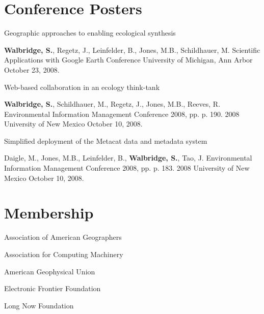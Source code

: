 \documentclass[letterpaper]{article}
\renewenvironment{itemize}{
  \begin{list}{}{
    \setlength{\leftmargin}{1.5em}
  }
}{
  \end{list}
}
\begin{document}
\section*{Conference Posters}
\begin{itemize}
\item Geographic approaches to enabling ecological synthesis
  \begin{itemize}
  \item {\bf Walbridge, S.}, Regetz, J., Leinfelder, B., Jones, M.B., Schildhauer, M. 
    Scientific Applications with Google Earth Conference
    University of Michigan, Ann Arbor
    October 23, 2008.
  \end{itemize}
\item Web-based collaboration in an ecology think-tank  
  \begin{itemize}
  \item  {\bf Walbridge, S.}, Schildhauer, M., Regetz, J., Jones, M.B., Reeves, R.
    Environmental Information Management Conference 2008, pp. p. 190. 2008 
    University of New Mexico
    October 10, 2008.
  \end{itemize}
\item Simplified deployment of the Metacat data and metadata system
  \begin{itemize}
  \item Daigle, M., Jones, M.B., Leinfelder, B., {\bf Walbridge, S.}, Tao, J.
    Environmental Information Management Conference 2008, pp. p. 183. 2008 
    University of New Mexico
    October 10, 2008.
  \end{itemize}
\end{itemize}

\section*{Membership}
\begin{itemize}
  \item Association of American Geographers
  \item Association for Computing Machinery
  \item American Geophysical Union
  \item Electronic Frontier Foundation
  \item Long Now Foundation
\end{itemize}
\end{document}
